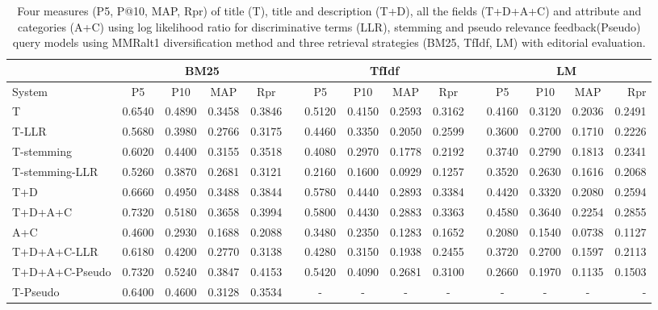 \begin{table}[H]
\begin{center}
\scriptsize
\caption{
Four measures (P\@5, P@10, MAP, Rpr) of title (T), title and description (T+D), all the fields (T+D+A+C) and attribute and categories (A+C) using log likelihood ratio for discriminative terms (LLR), stemming and pseudo relevance feedback(Pseudo) query models using MMRalt1 diversification method and three retrieval strategies (BM25, TfIdf, LM) with editorial evaluation.}
\label{table:mmrAlt1Ed}

\begin{tabular}{lcccccccccccccr}
\toprule
 & \multicolumn{4}{c}{BM25} &    & \multicolumn{4}{c}{TfIdf} &    & \multicolumn{4}{c}{LM} \\
\midrule
System & P\@5 & P\@10 & MAP & Rpr &   & P\@5 & P\@10 & MAP & Rpr &   & P\@5 & P\@10 & MAP & Rpr \\
\midrule

T & 0.6540 & 0.4890 & 0.3458 & 0.3846 &   & 0.5120 & 0.4150 & 0.2593 & 0.3162 &   & 0.4160 & 0.3120 & 0.2036 & 0.2491 \\
T-LLR & 0.5680 & 0.3980 & 0.2766 & 0.3175 &   & 0.4460 & 0.3350 & 0.2050 & 0.2599 &   & 0.3600 & 0.2700 & 0.1710 & 0.2226 \\
T-stemming & 0.6020 & 0.4400 & 0.3155 & 0.3518 &   & 0.4080 & 0.2970 & 0.1778 & 0.2192 &   & 0.3740 & 0.2790 & 0.1813 & 0.2341 \\
T-stemming-LLR & 0.5260 & 0.3870 & 0.2681 & 0.3121 &   & 0.2160 & 0.1600 & 0.0929 & 0.1257 &   & 0.3520 & 0.2630 & 0.1616 & 0.2068 \\
T+D  & 0.6660 & 0.4950 & 0.3488 & 0.3844 &   & 0.5780 & 0.4440 & 0.2893 & 0.3384 &   & 0.4420 & 0.3320 & 0.2080 & 0.2594 \\
T+D+A+C & 0.7320 & 0.5180 & 0.3658 & 0.3994  &   & 0.5800 & 0.4430 & 0.2883 & 0.3363 &   & 0.4580 & 0.3640 & 0.2254 & 0.2855 \\
A+C & 0.4600 & 0.2930 & 0.1688 & 0.2088 &   & 0.3480 & 0.2350 & 0.1283 & 0.1652 &   & 0.2080 & 0.1540 & 0.0738 & 0.1127 \\
T+D+A+C-LLR & 0.6180 & 0.4200 & 0.2770 & 0.3138 &   & 0.4280 & 0.3150 & 0.1938 & 0.2455 &   & 0.3720 & 0.2700 & 0.1597 & 0.2113 \\
T+D+A+C-Pseudo & 0.7320 & 0.5240 & 0.3847 & 0.4153 &   & 0.5420 & 0.4090 & 0.2681 & 0.3100 &   & 0.2660 & 0.1970 & 0.1135 & 0.1503 \\
T-Pseudo & 0.6400 & 0.4600 & 0.3128 & 0.3534 &   & - & - & - & - &   & - & - & - & -   \\
\bottomrule
\end{tabular}
\end{center}
\end{table}


